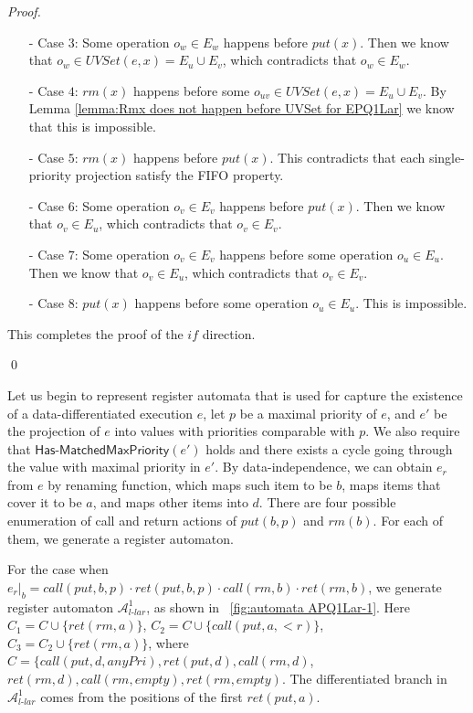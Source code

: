 \begin {proof}
\begin{itemize}
\item[-] Case $3$: Some operation $o_w \in E_w$ happens before $\textit{put}(x)$. Then we know that $o_w \in \textit{UVSet}(e,x) = E_u \cup E_v$, which contradicts that $o_w \in E_w$.

\item[-] Case $4$: $\textit{rm}(x)$ happens before some $o_{\textit{uv}} \in \textit{UVSet}(e,x) = E_u \cup E_v$. By Lemma \ref{lemma:Rmx does not happen before UVSet for EPQ1Lar} we know that this is impossible.

\item[-] Case $5$: $\textit{rm}(x)$ happens before $\textit{put}(x)$. This contradicts that each single-priority projection satisfy the FIFO property.

\item[-] Case $6$: Some operation $o_v \in E_v$ happens before $\textit{put}(x)$. Then we know that $o_v \in E_u$, which contradicts that $o_v \in E_v$.

\item[-] Case $7$: Some operation $o_v \in E_v$ happens before some operation $o_u \in E_u$. Then we know that $o_v \in E_u$, which contradicts that $o_v \in E_v$.

\item[-] Case $8$: $\textit{put}(x)$ happens before some operation $o_u \in E_u$. This is impossible.
\end{itemize}

This completes the proof of the $\textit{if}$ direction.

\qed
\end {proof}


Let us begin to represent register automata that is used for capture the existence of a data-differentiated execution $e$, let $p$ be a maximal priority of $e$, and $e'$ be the projection of $e$ into values with priorities comparable with $p$. We also require that $\mathsf{Has\text{-}MatchedMaxPriority}(e')$ holds and there exists a cycle going through the value with maximal priority in $e'$. By data-independence, we can obtain $e_r$ from $e$ by renaming function, which maps such item to be $b$, maps items that cover it to be $a$, and maps other items into $d$. There are four possible enumeration of call and return actions of $\textit{put}(b,p)$ and $\textit{rm}(b)$. For each of them, we generate a register automaton.

For the case when $e_r \vert_{b} = \textit{call}(\textit{put},b,p) \cdot \textit{ret}(\textit{put},b,p) \cdot \textit{call}(\textit{rm},b) \cdot \textit{ret}(\textit{rm},b)$, we generate register automaton $\mathcal{A}_{\textit{l-lar}}^1$, as shown in \figurename~\ref{fig:automata APQ1Lar-1}. Here $C_1 = C \cup \{ \textit{ret}(\textit{rm},a) \}$, $C_2 = C \cup \{ \textit{call}(\textit{put},a,<r) \}$, $C_3 = C_2 \cup \{ \textit{ret}(\textit{rm},a) \}$, where $C = \{ \textit{call}(\textit{put},d,\textit{anyPri}),\textit{ret}(\textit{put},d), \textit{call}(\textit{rm},d)$, $\textit{ret}(\textit{rm},d),\textit{call}(\textit{rm},\textit{empty}),\textit{ret}(\textit{rm},\textit{empty})$. The differentiated branch in $\mathcal{A}_{\textit{l-lar}}^1$ comes from the positions of the first $\textit{ret}(\textit{put},a)$.

